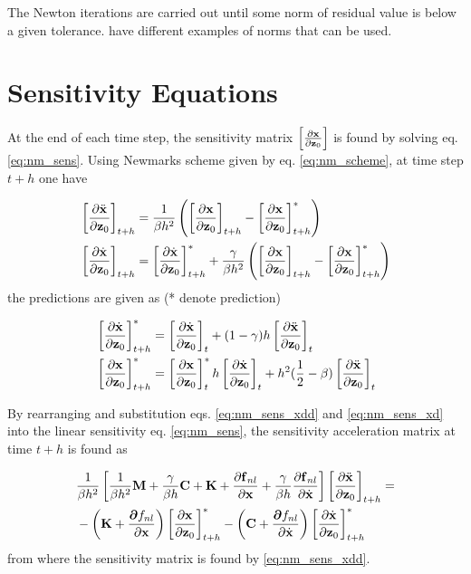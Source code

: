 The Newton iterations are carried out until some norm of residual value is below
a given tolerance. \textcite{cook2007concepts} have different examples of norms that
can be used.


\section{Sensitivity Equations}
\label{sec:newmark_sens}


At the end of each time step, the sensitivity matrix $\left[ \frac{\p \bm x}{\p
    \bm z_0} \right]$ is found by solving eq. \eqref{eq:nm_sens}.
Using Newmarks scheme given by eq. \eqref{eq:nm_scheme}, at time step $t+h$ one have

\begin{align}
\label{eq:nm_sens_xdd}
  &\left[ \frac{\p \ddot{\bm x}}{\p \bm z_0} \right]_{t+h} =
    \frac{1}{\beta h^2} \left(
    \left[ \frac{\p \bm x}{\p \bm z_0} \right]_{t+h} -
    \left[ \frac{\p \bm x}{\p \bm z_0} \right]^*_{t+h}
    \right) \\
\label{eq:nm_sens_xd}
  &\left[ \frac{\p \dot{\bm x}}{\p \bm z_0} \right]_{t+h} =
    \left[ \frac{\p \dot{\bm x}}{\p \bm z_0} \right]^*_{t+h} +
    \frac{\gamma}{\beta h^2} \left(
    \left[ \frac{\p \bm x}{\p \bm z_0} \right]_{t+h} -
    \left[ \frac{\p \bm x}{\p \bm z_0} \right]^*_{t+h}
    \right)
\end{align}
the predictions are given as (* denote prediction)

\begin{align}
  \label{eq:nm_sens_predict}
  &\left[ \frac{\p \dot{\bm x}}{\p \bm z_0} \right]^*_{t+h} =
    \left[ \frac{\p \dot{\bm x}}{\p \bm z_0} \right]_{t} +
    (1-\gamma)h \left[ \frac{\p \ddot {\bm x}}{\p \bm z_0} \right]_{t} \\
  &\left[ \frac{\p \bm x}{\p \bm z_0} \right]^*_{t+h} =
    \left[ \frac{\p \bm x}{\p \bm z_0} \right]^*_{t}
    h \left[ \frac{\p \dot {\bm x}}{\p \bm z_0} \right]_{t} +
    h^2(\frac{1}{2} - \beta) \left[ \frac{\p \ddot{\bm x}}{\p \bm z_0} \right]_{t}
\end{align}


By rearranging and substitution eqs. \eqref{eq:nm_sens_xdd} and
\eqref{eq:nm_sens_xd} into the linear sensitivity eq. \eqref{eq:nm_sens}, the
sensitivity acceleration matrix at time $t+h$ is found as

\begin{align}
  &\frac{1}{\beta h^2}
  \left[
    \frac{1}{\beta h^2} \bm M +
    \frac{\gamma}{\beta h} \bm C +
    \bm K +
    \frac{\p \bm f_{nl}}{\p \bm x} +
    \frac{\gamma}{\beta h} \frac{\p \bm f_{nl}}{\p \dot{\bm x}}
  \right]
    \left[ \frac{\p \ddot{\bm x}}{\p \bm z_0} \right]_{t+h} = \nonumber \\
 & -
  \left(\bm K + \frac{\bm \p f_{nl}}{\p \bm x} \right)
  \left[ \frac{\p \bm x}{\p \bm z_0} \right]^*_{t+h}
  -
  \left(\bm C + \frac{\bm \p f_{nl}}{\p \dot {\bm x}} \right)
  \left[ \frac{\p \dot{\bm x}}{\p \bm z_0} \right]^*_{t+h}
  \label{eq:nm_sens_sol}
\end{align}
from where the sensitivity matrix is found by \eqref{eq:nm_sens_xdd}.


